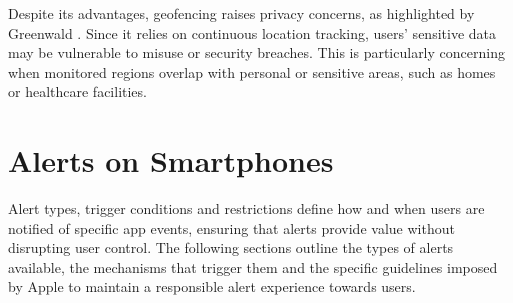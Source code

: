 Despite its advantages, geofencing raises privacy concerns, as highlighted by Greenwald \cite{greenwald2011geofencing}. 
Since it relies on continuous location tracking, users' sensitive data may be vulnerable to misuse or security breaches. 
This is particularly concerning when monitored regions overlap with personal or sensitive areas, such as homes or healthcare facilities.

\section{Alerts on Smartphones}
Alert types, trigger conditions and restrictions define how and when users are notified of specific app events, ensuring that alerts provide value without disrupting user control. 
The following sections outline the types of alerts available, the mechanisms that trigger them and the specific guidelines imposed by Apple to maintain a responsible alert experience towards users.

